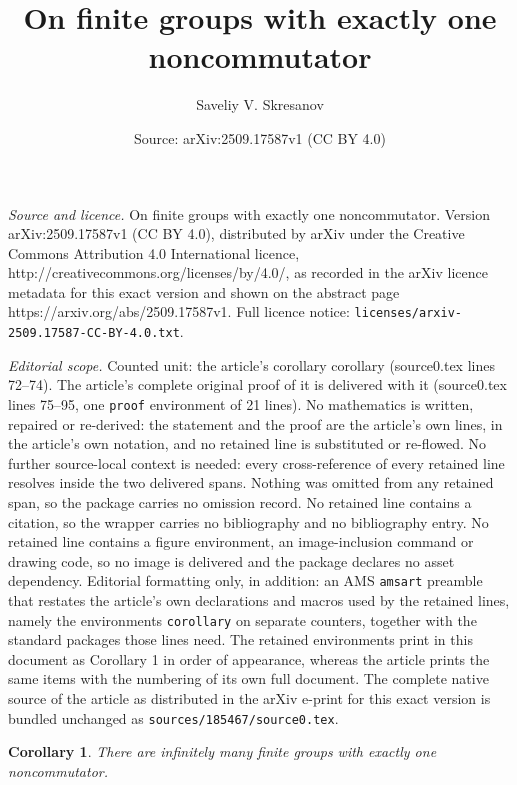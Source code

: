 \documentclass[10pt,a4paper]{amsart}
\title{On finite groups with exactly one noncommutator}
\author{Saveliy V. Skresanov}
\date{Source: arXiv:2509.17587v1 (CC BY 4.0)}
\newtheorem{corollary}{Corollary}
\begin{document}
\maketitle

\noindent\emph{Source and licence.} On finite groups with exactly one noncommutator. Version arXiv:2509.17587v1 (CC BY 4.0), distributed by arXiv under the Creative Commons Attribution 4.0 International licence, http://creativecommons.org/licenses/by/4.0/, as recorded in the arXiv licence metadata for this exact version and shown on the abstract page https://arxiv.org/abs/2509.17587v1. Full licence notice: \texttt{licenses/arxiv-2509.17587-CC-BY-4.0.txt}.\par\smallskip

\noindent\textit{Editorial scope.} Counted unit: the article's corollary corollary (source0.tex lines 72--74). The article's complete original proof of it is delivered with it (source0.tex lines 75--95, one \texttt{proof} environment of 21 lines). No mathematics is written, repaired or re-derived: the statement and the proof are the article's own lines, in the article's own notation, and no retained line is substituted or re-flowed.  No further source-local context is needed: every cross-reference of every retained line resolves inside the two delivered spans.  Nothing was omitted from any retained span, so the package carries no omission record.  No retained line contains a citation, so the wrapper carries no bibliography and no bibliography entry.  No retained line contains a figure environment, an image-inclusion command or drawing code, so no image is delivered and the package declares no asset dependency.  Editorial formatting only, in addition: an AMS \texttt{amsart} preamble that restates the article's own declarations and macros used by the retained lines, namely the environments \texttt{corollary} on separate counters, together with the standard packages those lines need.  The retained environments print in this document as Corollary 1 in order of appearance, whereas the article prints the same items with the numbering of its own full document.  The complete native source of the article as distributed in the arXiv e-print for this exact version is bundled unchanged as \texttt{sources/185467/source0.tex}.
\begin{corollary}
	There are infinitely many finite groups with exactly one noncommutator.
\end{corollary}
\end{document}
